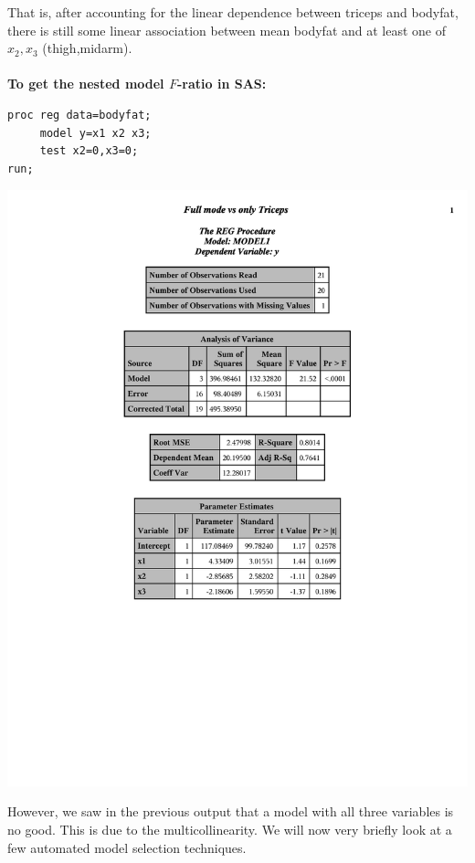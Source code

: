 That is, after accounting for the linear dependence between triceps and bodyfat, there is still some linear association between mean bodyfat and at least one of $x_2,x_3$ (thigh,midarm).  \\~\\

\textbf{To get the nested model $F$-ratio in SAS:}
\begin{small}
\begin{verbatim}
proc reg data=bodyfat;
     model y=x1 x2 x3;
     test x2=0,x3=0;
run;
\end{verbatim}
\end{small}

\begin{center}
\includegraphics[page=4,scale=0.6,trim= 10mm 200mm 10mm 10mm]{bodyfatexampletriceps}
\end{center}

However, we saw in the previous output that a model with all three variables is no good.  This is due to the multicollinearity.  We will now very briefly look at a few automated model selection techniques.


